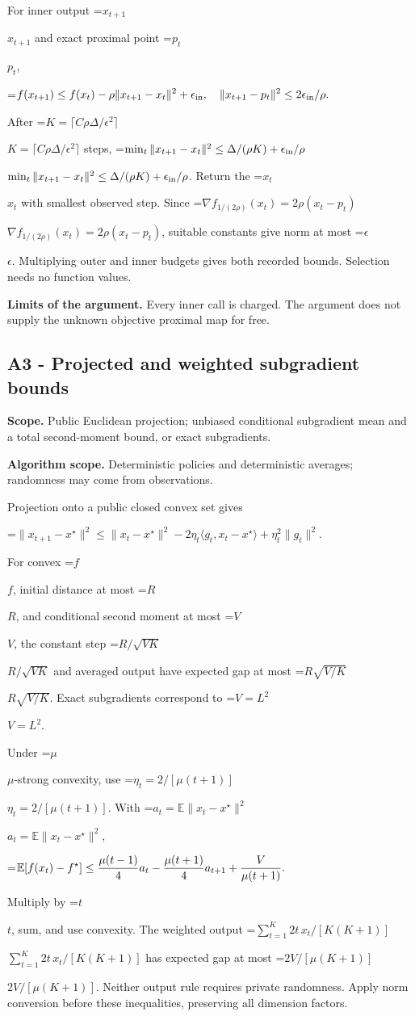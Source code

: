 \documentclass[10pt,a4paper]{article}
\newcommand{\AtlasMath}[1]{\par\begingroup\centering\setbox0=\hbox{$\displaystyle #1$}\ifdim\wd0>1.4\linewidth\typeout{ATLAS WIDE FORMULA: \the\wd0}\fi\ifdim\wd0>\linewidth\resizebox{\linewidth}{!}{\box0}\else\box0\fi\par\endgroup}
\newcommand{\AtlasInlineMath}[1]{\begingroup\setbox0=\hbox{$#1$}\ifdim\wd0>.4\linewidth\endgroup\AtlasMath{#1}\else\endgroup$#1$\fi}
\begin{document}
For inner output \AtlasInlineMath{x_{t+1}} and exact proximal point \AtlasInlineMath{p_t},

\AtlasMath{f(x_{t+1})\le f(x_t)-\rho\|x_{t+1}-x_t\|^2+\epsilon_{\rm in},
\quad
\|x_{t+1}-p_t\|^2\le2\epsilon_{\rm in}/\rho.}

After \AtlasInlineMath{K=\lceil C\rho\Delta/\epsilon^2\rceil} steps,
\AtlasInlineMath{\min_t\|x_{t+1}-x_t\|^2\le\Delta/(\rho K)+\epsilon_{\rm in}/\rho}.
Return the \AtlasInlineMath{x_t} with smallest observed step. Since
\AtlasInlineMath{\nabla f_{1/(2\rho)}(x_t)=2\rho(x_t-p_t)}, suitable constants give norm at most \AtlasInlineMath{\epsilon}. Multiplying outer and inner budgets gives both recorded bounds. Selection needs no function values.

\textbf{Limits of the argument.} Every inner call is charged. The argument does not supply the unknown objective proximal map for free.

\subsection{A3 - Projected and weighted subgradient bounds}
\textbf{Scope.} Public Euclidean projection; unbiased conditional subgradient mean and a total second-moment bound, or exact subgradients.

\textbf{Algorithm scope.} Deterministic policies and deterministic averages; randomness may come from observations.

Projection onto a public closed convex set gives

\AtlasMath{\|x_{t+1}-x^\star\|^2\le\|x_t-x^\star\|^2
-2\eta_t\langle g_t,x_t-x^\star\rangle+\eta_t^2\|g_t\|^2.}

For convex \AtlasInlineMath{f}, initial distance at most \AtlasInlineMath{R}, and conditional second moment at most \AtlasInlineMath{V}, the constant step \AtlasInlineMath{R/\sqrt{VK}} and averaged output have expected gap at most \AtlasInlineMath{R\sqrt{V/K}}. Exact subgradients correspond to \AtlasInlineMath{V=L^2}.

Under \AtlasInlineMath{\mu}-strong convexity, use \AtlasInlineMath{\eta_t=2/[\mu(t+1)]}. With \AtlasInlineMath{a_t=\mathbb E\|x_t-x^\star\|^2},

\AtlasMath{\mathbb E[f(x_t)-f^\star]\le{\mu(t-1)\over4}a_t
-{\mu(t+1)\over4}a_{t+1}+{V\over\mu(t+1)}.}

Multiply by \AtlasInlineMath{t}, sum, and use convexity. The weighted output
\AtlasInlineMath{\sum_{t=1}^K2t\,x_t/[K(K+1)]} has expected gap at most \AtlasInlineMath{2V/[\mu(K+1)]}. Neither output rule requires private randomness. Apply norm conversion before these inequalities, preserving all dimension factors.
\end{document}
